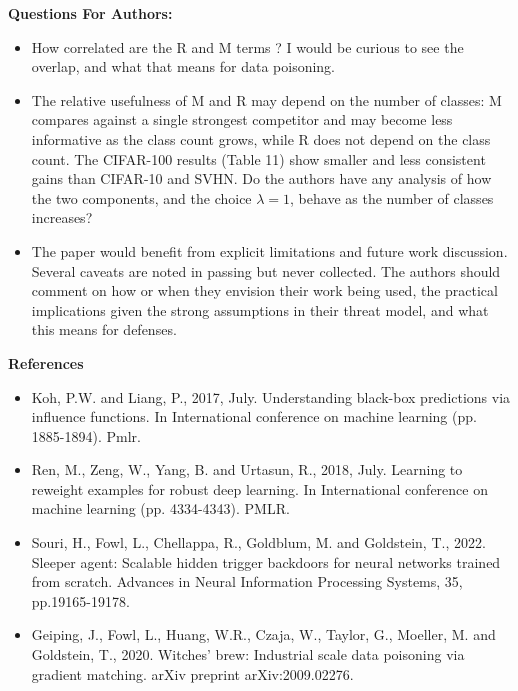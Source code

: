 \noindent\textbf{Questions For Authors:}

\begin{itemize}
    \item How correlated are the R and M terms ? I would be curious to see the overlap, and what that means for data poisoning.

    \item The relative usefulness of M and R may depend on the number of classes: M compares against a single strongest competitor and may become less informative as the class count grows, while R does not depend on the class count. The CIFAR-100 results (Table 11) show smaller and less consistent gains than CIFAR-10 and SVHN. Do the authors have any analysis of how the two components, and the choice $\lambda = 1$, behave as the number of classes increases?

    \item The paper would benefit from explicit limitations and future work discussion. Several caveats are noted in passing but never collected. The authors should comment on how or when they envision their work being used, the practical implications given the strong assumptions in their threat model, and what this means for defenses.
\end{itemize}

\noindent\textbf{References}


\begin{itemize}
    \item[{[1]}] \footnotesize{Koh, P.W. and Liang, P., 2017, July. Understanding black-box predictions via influence functions. In International conference on machine learning (pp. 1885-1894). Pmlr.}
    \item[{[2]}] \footnotesize{Ren, M., Zeng, W., Yang, B. and Urtasun, R., 2018, July. Learning to reweight examples for robust deep learning. In International conference on machine learning (pp. 4334-4343). PMLR.}
    \item[{[3]}] \footnotesize{Souri, H., Fowl, L., Chellappa, R., Goldblum, M. and Goldstein, T., 2022. Sleeper agent: Scalable hidden trigger backdoors for neural networks trained from scratch. Advances in Neural Information Processing Systems, 35, pp.19165-19178.}
    \item[{[4]}] \footnotesize{Geiping, J., Fowl, L., Huang, W.R., Czaja, W., Taylor, G., Moeller, M. and Goldstein, T., 2020. Witches' brew: Industrial scale data poisoning via gradient matching. arXiv preprint arXiv:2009.02276.}
\end{itemize}


